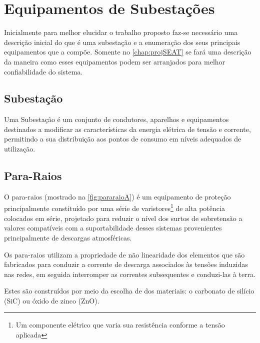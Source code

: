 \documentclass[a5paper,english,spanish,brazil]{ufsc-thesis}
\begin{document}
\chapter{Equipamentos de Subestações}
	\label{chap:equipSE}
	Inicialmente para melhor elucidar o trabalho proposto faz-se necessário uma descrição inicial do que é uma subestação e a enumeração dos seus principais equipamentos que a compõe. Somente no \autoref{chap:projSEAT} se fará uma descrição da maneira como esses equipamentos podem ser arranjados para melhor confiabilidade do sistema.
	\section*{Subestação}
	Uma Subestação é um conjunto de condutores, aparelhos e equipamentos destinados a modificar as características da energia elétrica de tensão e corrente, permitindo a sua distribuição aos pontos de consumo em níveis adequados de utilização.\cite{instElet}

	\section{Para-Raios}
		O para-raios (mostrado na \autoref{fig:pararaioA}) é um equipamento de proteção principalmente constituído por uma série de varistores\footnote{Um componente elétrico que varia sua resistência conforme a tensão aplicada\cite[p. 413]{BellSytemHistory}} de alta potência colocados em série, projetado para reduzir o nível dos surtos de sobretensão a valores compatíveis com a suportabilidade desses sistemas provenientes principalmente de descargas atmosféricas.\par
		Os para-raios utilizam a propriedade de não linearidade dos elementos que são fabricados para conduzir a corrente de descarga associados às tensões induzidas nas redes, em seguida interromper as correntes subsequentes e conduzi-las à terra.\par
		Estes são construídos por meio da escolha de dos materiais: o carbonato de silício (SiC) ou óxido de zinco (ZnO). 
\end{document}
